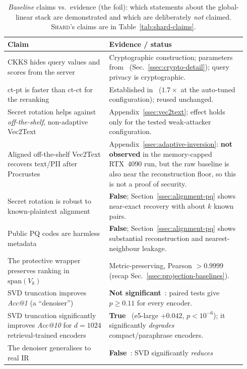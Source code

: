 \documentclass[11pt,a4paper]{article}
\begin{document}
\begin{table}[tbp]
\centering
\caption{\emph{Baseline} claims vs.\ evidence (the foil): which statements
about the global-linear stack are demonstrated and which are deliberately
\emph{not} claimed. \textsc{Shard}'s claims are in
Table~\ref{tab:shard-claims}.}
\label{tab:claims}
\small
\begin{tabular}{@{}p{0.40\linewidth}p{0.54\linewidth}@{}}
\toprule
\textbf{Claim} & \textbf{Evidence / status} \\ \midrule
CKKS hides query values and scores from the server &
Cryptographic construction; parameters from~\cite{ref_alpha}
(Sec.~\ref{ssec:crypto-detail}); query privacy is cryptographic. \\
ct-pt is faster than ct-ct for the reranking &
Established in~\cite{ref_alpha} ($1.7\times$ at the auto-tuned
configuration); reused unchanged. \\
Secret rotation helps against \emph{off-the-shelf}, non-adaptive
Vec2Text & Appendix~\ref{ssec:vec2text}; effect holds only for the
tested weak-attacker configuration. \\
Aligned off-the-shelf Vec2Text recovers text/PII after Procrustes &
Appendix~\ref{ssec:adaptive-inversion}: \textbf{not observed} in the
memory-capped RTX~4090 run, but the raw baseline is also near the
reconstruction floor, so this is not a proof of security. \\
Secret rotation is robust to known-plaintext alignment &
\textbf{False}; Section~\ref{ssec:alignment-pq} shows near-exact
recovery with about $k$ known pairs. \\
Public PQ codes are harmless metadata &
\textbf{False}; Section~\ref{ssec:alignment-pq} shows substantial
reconstruction and nearest-neighbour leakage. \\
The protective wrapper preserves ranking in $\mathrm{span}(V_k)$ &
Metric-preserving, Pearson $>0.9999$~\cite{ref_alpha} (recap Sec.~\ref{ssec:projection-baselines}). \\
SVD truncation improves \emph{Acc@1} (a ``denoiser'') &
\textbf{Not significant}~\cite{ref_alpha}: paired tests give
$p\geq0.11$ for every encoder. \\
SVD truncation significantly improves \emph{Acc@10} for $d{=}1024$
retrieval-trained encoders &
\textbf{True}~\cite{ref_alpha} (e5-large $+0.042$, $p<10^{-6}$); it
significantly \emph{degrades} compact/paraphrase encoders. \\
The denoiser generalises to real IR &
\textbf{False}~\cite{ref_alpha}: SVD significantly \emph{reduces}

\end{tabular}
\end{table}
\end{document}
